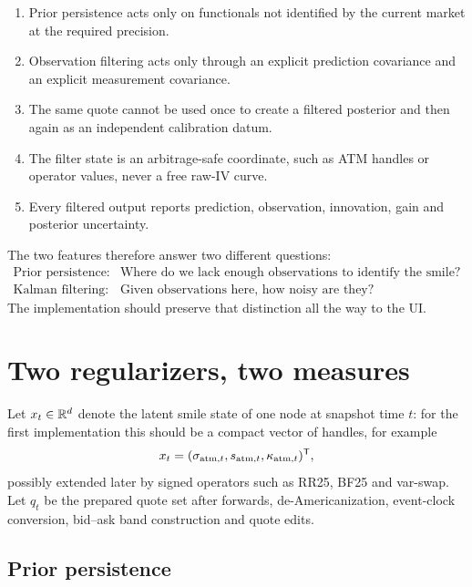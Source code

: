 \documentclass[11pt]{article}
\begin{document}
\begin{invariant}
\begin{enumerate}[leftmargin=1.6em]
\item Prior persistence acts only on functionals not identified by the current
market at the required precision.
\item Observation filtering acts only through an explicit prediction covariance
and an explicit measurement covariance.
\item The same quote cannot be used once to create a filtered posterior and then
again as an independent calibration datum.
\item The filter state is an arbitrage-safe coordinate, such as ATM handles or
operator values, never a free raw-IV curve.
\item Every filtered output reports prediction, observation, innovation, gain
and posterior uncertainty.
\end{enumerate}
\end{invariant}

The two features therefore answer two different questions:
\[
\begin{array}{ll}
\text{Prior persistence:} & \text{Where do we lack enough observations to
identify the smile?}\\[2pt]
\text{Kalman filtering:} & \text{Given observations here, how noisy are they?}
\end{array}
\]
The implementation should preserve that distinction all the way to the UI.

\section{Two regularizers, two measures}
\label{sec:split}

Let $x_t\in\mathbb{R}^d$ denote the latent smile state of one node at snapshot time
$t$: for the first implementation this should be a compact vector of handles,
for example
\[
x_t=(\sigma_{\mathrm{atm},t},s_{\mathrm{atm},t},\kappa_{\mathrm{atm},t})^{\mathsf{T}},
\]
possibly extended later by signed operators such as RR25, BF25 and var-swap.
Let $q_t$ be the prepared quote set after forwards, de-Americanization,
event-clock conversion, bid--ask band construction and quote edits.

\subsection{Prior persistence}
\end{document}
